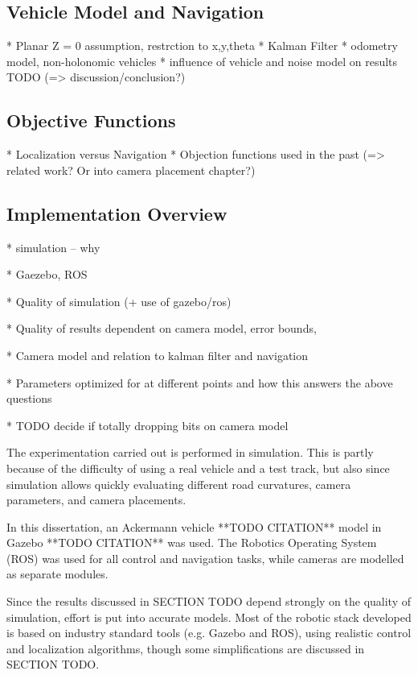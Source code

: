 \documentclass[a4paper,12pt,twoside,openright]{report}
\makeatletter
\newcommand*{\eg}{e.g.\@\xspace}
\makeatother
\begin{document}
\subsection{Vehicle Model and Navigation}

* Planar Z = 0 assumption, restrction to x,y,theta
* Kalman Filter
* odometry model, non-holonomic vehicles
* influence of vehicle and noise model on results TODO (=> discussion/conclusion?)

\subsection{Objective Functions}

* Localization versus Navigation
* Objection functions used in the past (=> related work? Or into camera placement chapter?) 

\subsection{Implementation Overview}

* simulation -- why

* Gaezebo, ROS

* Quality of simulation (+ use of gazebo/ros)

* Quality of results dependent on camera model, error bounds, 

* Camera model and relation to kalman filter and navigation

* Parameters optimized for at different points and how this answers
 the above questions
 
* TODO decide if totally dropping bits on camera model






The experimentation carried out is performed in simulation. 
This is partly because of the difficulty of using a real vehicle and a test track, but
also since simulation allows quickly evaluating different road curvatures, camera parameters,
and camera placements.

In this dissertation, an Ackermann vehicle **TODO CITATION** model in Gazebo **TODO CITATION**
was used. The Robotics Operating System (ROS) was used for all control and navigation tasks,
while cameras are modelled as separate modules.

Since the results discussed in SECTION TODO depend strongly on the quality of simulation,
effort is put into accurate models. Most of the robotic stack developed is based on
industry standard tools (\eg Gazebo and ROS), using realistic control and localization
algorithms, though some simplifications are discussed in SECTION TODO.
\end{document}
